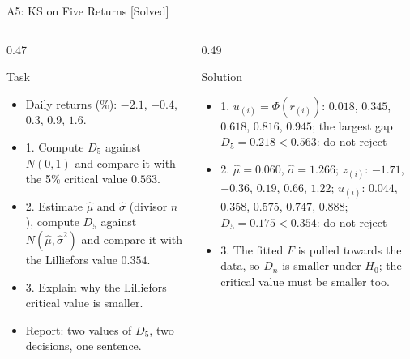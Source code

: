 \begin{frame}{A5: KS on Five Returns [Solved]}
\itemsize{\scriptsize}
\begin{columns}[T]
\begin{column}{0.47\textwidth}
\begin{block}{Task}
\begin{itemize}
    \item Daily returns (\%): $-2.1$, $-0.4$, $0.3$, $0.9$, $1.6$.
    \item 1. Compute $D_5$ against $N(0, 1)$ and compare it with the 5\% critical value $0.563$.
    \item 2. Estimate $\hat\mu$ and $\hat\sigma$ (divisor $n$), compute $D_5$ against $N(\hat\mu, \hat\sigma^2)$ and compare it with the Lilliefors value $0.354$.
    \item 3. Explain why the Lilliefors critical value is smaller.
    \item Report: two values of $D_5$, two decisions, one sentence.
\end{itemize}
\end{block}
\end{column}
\begin{column}{0.49\textwidth}
\begin{exampleblock}{Solution}
\begin{itemize}
    \item 1. $u_{(i)} = \Phi(r_{(i)})$: $0.018$, $0.345$, $0.618$, $0.816$, $0.945$; the largest gap $D_5 = 0.218 < 0.563$: do not reject
    \item 2. $\hat\mu = 0.060$, $\hat\sigma = 1.266$; $z_{(i)}$: $-1.71$, $-0.36$, $0.19$, $0.66$, $1.22$; $u_{(i)}$: $0.044$, $0.358$, $0.575$, $0.747$, $0.888$; $D_5 = 0.175 < 0.354$: do not reject
    \item 3. The fitted $F$ is pulled towards the data, so $D_n$ is smaller under $H_0$; the critical value must be smaller too.
\end{itemize}
\end{exampleblock}
\end{column}
\end{columns}
\end{frame}

